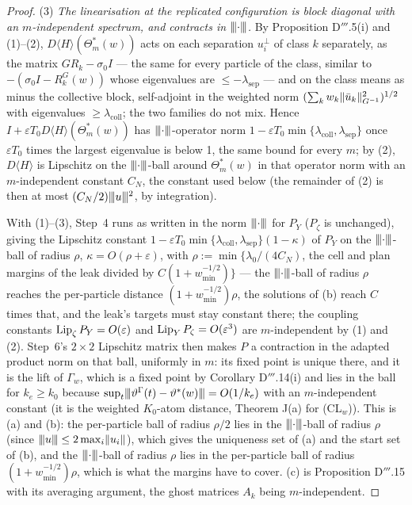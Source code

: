 \begin{proof}
(3) \emph{The linearisation at the replicated configuration is block diagonal with an $m$-independent spectrum, and
contracts in $\lvert\kern-0.25ex\lvert\kern-0.25ex\lvert \cdot\rvert\kern-0.25ex\rvert\kern-0.25ex\rvert$.} By Proposition D$'''$.5(i) and (1)--(2), $D\langle H\rangle(\Theta^*_m(w))$ acts on each
separation $u_i^\perp$ of class $k$ separately, as the matrix $GR_k - \sigma_0I$ --- the same for every particle of
the class, similar to $-(\sigma_0I - R^G_k(w))$ whose eigenvalues are $\le-\lambda_{\mathrm{sep}}$ --- and on the
class means as minus the collective block, self-adjoint in the weighted norm
$(\sum_kw_k\lVert \bar u_k\rVert^2_{G^{-1}})^{1/2}$ with eigenvalues $\ge\lambda_{\mathrm{coll}}$; the two families do not
mix. Hence $I + \varepsilon T_0D\langle H\rangle(\Theta^*_m(w))$ has $\lvert\kern-0.25ex\lvert\kern-0.25ex\lvert \cdot\rvert\kern-0.25ex\rvert\kern-0.25ex\rvert$-operator norm
$1 - \varepsilon T_0\min\{\lambda_{\mathrm{coll}},\lambda_{\mathrm{sep}}\}$ once $\varepsilon T_0$ times the largest
eigenvalue is below 1, the same bound for every $m$; by (2), $D\langle H\rangle$ is Lipschitz on the
$\lvert\kern-0.25ex\lvert\kern-0.25ex\lvert \cdot\rvert\kern-0.25ex\rvert\kern-0.25ex\rvert$-ball around $\Theta^*_m(w)$ in that operator norm with an $m$-independent constant $C_N$, the
constant used below (the remainder of (2) is then at most $(C_N/2)\lvert\kern-0.25ex\lvert\kern-0.25ex\lvert u\rvert\kern-0.25ex\rvert\kern-0.25ex\rvert^2$, by integration).

With (1)--(3), Step~4 runs as written in the norm $\lvert\kern-0.25ex\lvert\kern-0.25ex\lvert \cdot\rvert\kern-0.25ex\rvert\kern-0.25ex\rvert$ for $P_Y$ ($P_\zeta$ is unchanged), giving the
Lipschitz constant $1 - \varepsilon T_0\min\{\lambda_{\mathrm{coll}},\lambda_{\mathrm{sep}}\}(1 - \kappa)$ of $P_Y$ on
the $\lvert\kern-0.25ex\lvert\kern-0.25ex\lvert \cdot\rvert\kern-0.25ex\rvert\kern-0.25ex\rvert$-ball of radius $\rho$, $\kappa = O(\rho + \varepsilon)$, with $\rho := \min\{\lambda_0/(4C_N)$,
the cell and plan margins of the leak divided by $C(1 + w_{\min}^{-1/2})\}$ --- the $\lvert\kern-0.25ex\lvert\kern-0.25ex\lvert \cdot\rvert\kern-0.25ex\rvert\kern-0.25ex\rvert$-ball of radius
$\rho$ reaches the per-particle distance $(1 + w_{\min}^{-1/2})\rho$, the solutions of (b) reach $C$ times that, and
the leak's targets must stay constant there; the coupling constants $\operatorname{Lip}_\zeta P_Y = O(\varepsilon)$ and
$\operatorname{Lip}_YP_\zeta = O(\varepsilon^3)$ are $m$-independent by (1) and (2). Step~6's $2\times2$ Lipschitz matrix then makes
$P$ a contraction in the adapted product norm on that ball, uniformly in $m$: its fixed point is unique there, and it
is the lift of $\Gamma_w$, which is a fixed point by Corollary D$'''$.14(i) and lies in the ball for $k_e\ge k_0$
because $\sup_t\lvert\kern-0.25ex\lvert\kern-0.25ex\lvert \vartheta^\Gamma(t) - \vartheta^*(w)\rvert\kern-0.25ex\rvert\kern-0.25ex\rvert = O(1/k_e)$ with an $m$-independent constant (it is the
weighted $K_0$-atom distance, Theorem J(a) for \textup{(CL$_w$)}). This is (a) and (b): the per-particle ball of
radius $\rho/2$ lies in the $\lvert\kern-0.25ex\lvert\kern-0.25ex\lvert \cdot\rvert\kern-0.25ex\rvert\kern-0.25ex\rvert$-ball of radius $\rho$ (since $\lvert\kern-0.25ex\lvert\kern-0.25ex\lvert u\rvert\kern-0.25ex\rvert\kern-0.25ex\rvert\le2\max_i\lVert u_i\rVert$), which
gives the uniqueness set of (a) and the start set of (b), and the $\lvert\kern-0.25ex\lvert\kern-0.25ex\lvert \cdot\rvert\kern-0.25ex\rvert\kern-0.25ex\rvert$-ball of radius $\rho$ lies in the
per-particle ball of radius $(1 + w_{\min}^{-1/2})\rho$, which is what the margins have to cover. (c) is Proposition
D$'''$.15 with its averaging argument, the ghost matrices $A_k$ being $m$-independent.
\end{proof}

